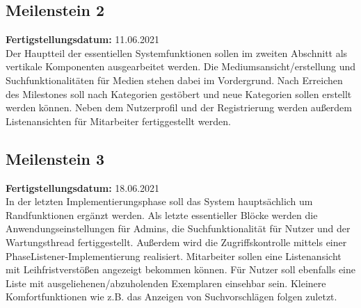 \documentclass{article}
\begin{document}
\subsection{Meilenstein 2}
\textbf{Fertigstellungsdatum:} 11.06.2021 \\
Der Hauptteil der essentiellen Systemfunktionen sollen im zweiten Abschnitt als vertikale Komponenten ausgearbeitet werden. Die Mediumsansicht/erstellung und Suchfunktionalitäten für Medien stehen dabei im Vordergrund. Nach Erreichen des Milestones soll nach Kategorien gestöbert und neue Kategorien sollen erstellt werden können. Neben dem Nutzerprofil und der Registrierung werden außerdem Listenansichten für Mitarbeiter fertiggestellt werden.
\subsection{Meilenstein 3}
\textbf{Fertigstellungsdatum:} 18.06.2021 \\
In der letzten Implementierungsphase soll das System hauptsächlich um Randfunktionen ergänzt werden. Als letzte essentieller Blöcke werden die Anwendungseinstellungen für Admins, die Suchfunktionalität für Nutzer und der Wartungsthread fertiggestellt. Außerdem wird die Zugriffskontrolle mittels einer PhaseListener-Implementierung realisiert. Mitarbeiter sollen eine Listenansicht mit  Leihfristverstößen angezeigt bekommen können. Für Nutzer soll ebenfalls eine Liste mit ausgeliehenen/abzuholenden Exemplaren einsehbar sein. Kleinere Komfortfunktionen wie z.B. das Anzeigen von Suchvorschlägen folgen zuletzt.
\end{document}
